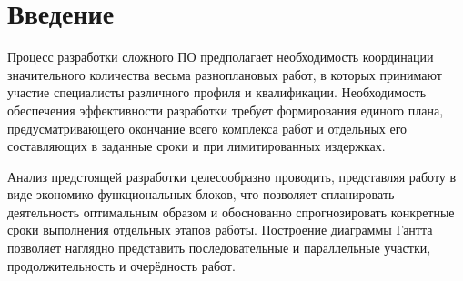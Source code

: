 \section{Введение} \label{economics_introduction}

Процесс разработки сложного ПО предполагает необходимость координации значительного количества весьма разноплановых работ, в которых принимают участие специалисты различного профиля и квалификации. Необходимость обеспечения эффективности разработки требует формирования единого плана, предусматривающего окончание всего комплекса работ и отдельных его составляющих в заданные сроки и при лимитированных издержках.

\vspace{\baselineskip}
Анализ предстоящей разработки целесообразно проводить, представляя работу в виде экономико-функциональных блоков, что позволяет спланировать деятельность оптимальным образом и обоснованно спрогнозировать конкретные сроки выполнения отдельных этапов работы. Построение диаграммы Гантта позволяет наглядно представить последовательные и параллельные участки, продолжительность и очерёдность работ.

